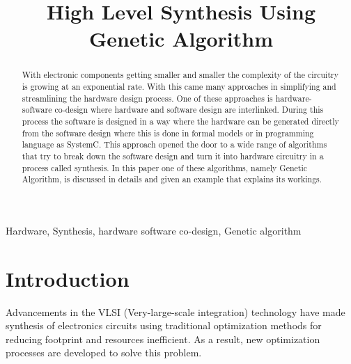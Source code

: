 \documentclass[conference]{IEEEtran}
\begin{document}
\title{High Level Synthesis Using Genetic Algorithm\\
}

\author{
}

\maketitle

\begin{abstract}
With electronic components getting smaller and smaller the complexity of the circuitry is growing at an exponential rate. With this came many approaches in simplifying and streamlining the hardware design process. One of these approaches is hardware-software co-design where hardware and software design are interlinked. During this process the software is designed in a way where the hardware can be generated directly from the software design where this is done in formal models or in programming language as SystemC. This approach opened the door to a wide range of algorithms that try to break down the software design and turn it into hardware circuitry in a process called synthesis. In this paper one of these algorithms, namely Genetic Algorithm, is discussed in details and given an example that explains its workings.
\end{abstract}

\begin{IEEEkeywords}
Hardware, Synthesis, hardware software co-design, Genetic algorithm
\end{IEEEkeywords}

\section{Introduction}
Advancements in the VLSI (Very-large-scale integration) technology have made synthesis of electronics circuits using traditional optimization methods for reducing footprint and resources inefficient. As a result, new optimization processes are developed to solve this problem\cite{aminzadeh2006using}.
\end{document}
